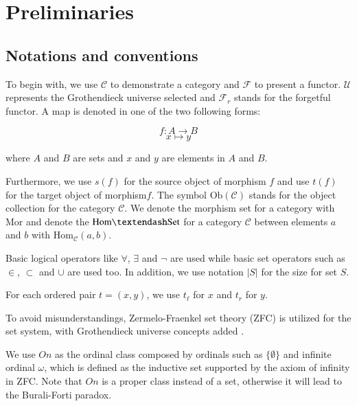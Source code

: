 \documentclass{aims}
\numberwithin{equation}{section}
\numberwithin{theorem}{section}	%
\numberwithin{axiom}{section}	%
\numberwithin{definition}{section}	%
\begin{document}
	\section{Preliminaries}
	
	\subsection{Notations and conventions}
	
	To begin with, we use \(\mathcal{C}\) to demonstrate a category and \(\mathcal{F}\) to present a functor. \(\mathcal{U}\) represents the Grothendieck universe selected and \(\mathcal{F}_r\) stands for the forgetful functor. A map is denoted in one of the two following forms:
	
	\begin{equation*}
		f: A \to B
	\end{equation*}
	\begin{equation*}
		x\mapsto y
	\end{equation*}
	
	\noindent where \(A\) and \(B\) are sets and \(x\) and \(y\) are elements in \(A\) and \(B\).
	
	Furthermore, we use \(s(f)\) for the source object of morphism \(f\)\textit{  }and use \(t(f)\) for the target object of morphism\(f\). The symbol \(\text{Ob}(\mathcal{C})\) stands for the object collection for the category \(\mathcal{C}\). We denote the morphism set for a category with \(\text{Mor}\) and denote the \(\text{Hom}\textendash\text{Set}\) for a category \(\mathcal{C}\) between elements \(a\) and \(b\) with \(\text{Hom}_{\mathcal{C}}(a,b)\).
	
	Basic logical operators like \(\forall\), \(\exists\) and \(\neg\) are used while basic set operators such as \(\in\), \(\subset\) and \(\cup\) are used too. In addition, we use notation \(|S|\) for the size for set \(S\).
	
	For each ordered pair \(t=(x,y)\), we use \(t_{\ell }\) for \(x\) and \(t_{\mathit{r}}\) for \(y\).
	
	To avoid misunderstandings, {Zermelo-Fraenkel set theory} (ZFC) is utilized for the set system, with Grothendieck universe concepts added \cite{Li2019}.
	
	We use \(On\) as the ordinal class composed by ordinals \cite{Li2019} such as \(\{\emptyset\}\) and infinite ordinal \(\omega\), which is defined as the inductive set supported by the axiom of infinity in ZFC. Note that \(On\) is a proper class instead of a set, otherwise it will lead to the Burali-Forti paradox.
	
\end{document}
